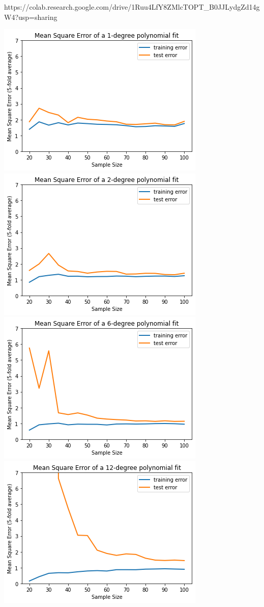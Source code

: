 \begin{solution}
https://colab.research.google.com/drive/1Ruu4LfY8ZMlcTOPT_B0JJLydgZd14gW4?usp=sharing

\includegraphics{set1/images/Unknown-6.png}\\
\includegraphics{set1/images/Unknown-7.png}\\
\includegraphics{set1/images/Unknown-8.png}\\
\includegraphics{set1/images/Unknown-9.png}



\end{solution}
